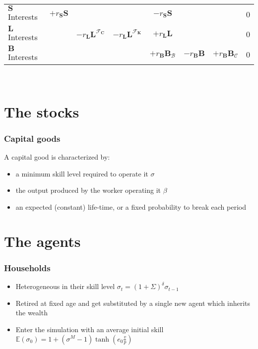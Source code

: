 \documentclass[]{beamer}
\begin{document}
\begin{frame}
{\begin{tabularx}{\textwidth}{@{} Y|cccccc|l @{}}
			\midrule
			$\mathbf{S}$ Interests & $+r_{\mathbf{S}} \mathbf{S}$             &                                                         &                                                                        & $-r_{\mathbf{S}} \mathbf{S}$           &                                          &                                        & 0    \\
			$\mathbf{L}$ Interests &                                          & $-r_{\mathbf{L}} \mathbf{L}^{\mathcal{F}_{\mathbf{C}}}$ & $-r_{\mathbf{L}} \mathbf{L}^{\mathcal{F}_{\mathbf{K}}}$                & $+r_{\mathbf{L}} \mathbf{L}$           &                                          &                                        & 0    \\
			$\mathbf{B}$ Interests &                                          &                                                         &                                                                        & $+r_\mathbf{B} \mathbf{B}_\mathcal{B}$ & $-r_\mathbf{B} \mathbf{B}$               & $+r_\mathbf{B} \mathbf{B}_\mathcal{C}$ & 0    \\
			\bottomrule
		\end{tabularx}
	}\\
\end{frame}

\section{The stocks}
\begin{frame}
	\frametitle{Capital goods}
	A capital good is characterized by:
	\begin{itemize}
		\item a minimum skill level required to operate it $\sigma$
		\item the output produced by the worker operating it $\beta$
		\item an expected (constant) life-time, or a fixed probability to break each period
	\end{itemize}
\end{frame}

\section{The agents}
\begin{frame}
	\frametitle{Households}
	\begin{itemize}
		\item Heterogeneous in their skill level $\sigma_t = (1+\Sigma)^\delta \sigma_{t-1}$
		\item Retired at fixed age and get substituted by a single new agent which inherits the wealth
		\item Enter the simulation with an average initial skill $\mathbb{E}(\sigma_0) = 1+(\sigma^M-1)\tanh(e_0 \frac{v}{p})$
	\end{itemize}
\end{frame}
\end{document}

